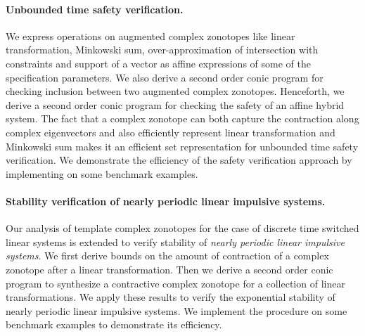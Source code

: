 \documentclass[11pt,a4paper,twoside,openright]{article}
\begin{document}
\paragraph{Unbounded time safety verification.}
We express operations on augmented complex zonotopes like linear
transformation, Minkowski sum, over-approximation of intersection with
constraints and support of a vector as affine expressions of some of
the specification parameters.   We also derive a second order conic
program for checking inclusion between two augmented complex
zonotopes.  Henceforth, we derive a second order conic
program for checking the safety of an affine hybrid system.  The fact
that a complex zonotope can both capture the contraction along complex
eigenvectors and also efficiently represent linear transformation and
Minkowski sum makes it an efficient set representation for unbounded
time safety verification.  We demonstrate the efficiency of the safety
verification approach by implementing on some benchmark examples.

\paragraph{Stability verification of nearly periodic linear impulsive
  systems.}  %
  Our analysis of template complex zonotopes for the case of discrete
  time switched linear systems is extended to verify stability of {\it nearly
    periodic linear impulsive systems}.  We first derive bounds on the
  amount of contraction of a complex zonotope after a linear
  transformation.  Then we derive a second order conic program to
  synthesize a contractive complex zonotope for a collection of linear
  transformations.  We apply these results to verify the exponential
  stability of nearly periodic linear impulsive systems.  We implement
  the procedure on some benchmark examples to demonstrate its
  efficiency.
\end{document}
